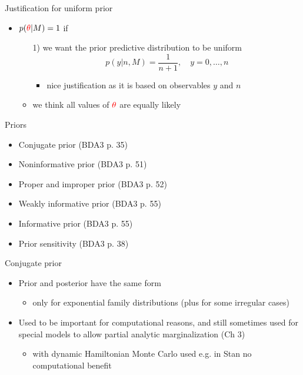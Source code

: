 \documentclass[english,t]{beamer}
\begin{document}

\begin{frame}{Justification for uniform prior}

  \begin{itemize}
  \item $p({\color{red}\theta}|M)=1$ if
    \begin{itemize}
    \item[1)] we want the prior predictive distribution to be uniform
      \begin{equation*}
        p(y|n,M) = \frac{1}{n+1}, \quad y=0,\ldots,n
      \end{equation*}
      \begin{itemize}
      \item nice justification as it is based on observables $y$ and $n$
      \end{itemize}
    \item<2->[2)] we think all values of ${\color{red}\theta}$ are equally likely
    \end{itemize} 
  \end{itemize}

\end{frame}


\begin{frame}{Priors}

  \begin{itemize}
  \item Conjugate prior (BDA3 p. 35)
  \item Noninformative prior (BDA3 p. 51)
  \item Proper and improper prior (BDA3 p. 52)
  \item Weakly informative prior (BDA3 p. 55)
  \item Informative prior (BDA3 p. 55)
  \item Prior sensitivity (BDA3 p. 38)
  \end{itemize}

\end{frame}

\begin{frame}{Conjugate prior}

  \begin{itemize}
  \item Prior and posterior have the same form
    \begin{itemize}
    \item only for exponential family distributions (plus for
      some irregular cases)
    \end{itemize}
  \item Used to be important for computational reasons, and still
    sometimes used for special models to allow partial analytic
    marginalization (Ch 3)
    \begin{itemize}
    \item with dynamic Hamiltonian Monte Carlo used e.g. in Stan no
      computational benefit
    \end{itemize}
  \end{itemize}
  
\end{frame}
\end{document}
